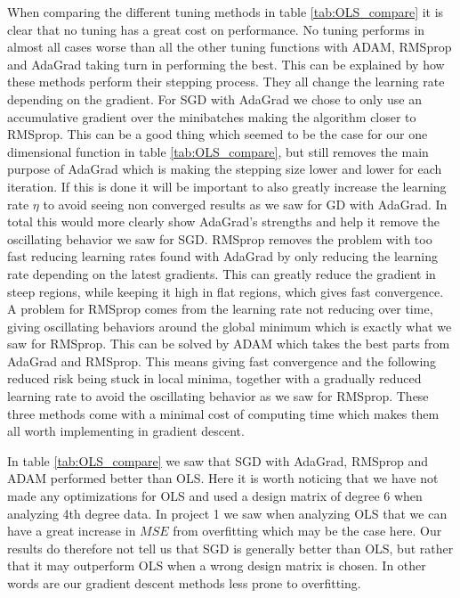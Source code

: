 \documentclass[11pt]{article}
\begin{document}
When comparing the different tuning methods in table \ref{tab:OLS_compare} it is clear that no tuning has a great cost on performance. No tuning performs in almost all cases worse than all the other tuning functions with ADAM, RMSprop and AdaGrad taking turn in performing the best. This can be explained by how these methods perform their stepping process. They all change the learning rate depending on the gradient. For SGD with AdaGrad we chose to only use an accumulative gradient over the minibatches making the algorithm closer to RMSprop. This can be a good thing which seemed to be the case for our one dimensional function in table \ref{tab:OLS_compare}, but still removes the main purpose of AdaGrad which is making the stepping size lower and lower for each iteration. If this is done it will be important to also greatly increase the learning rate $\eta$ to avoid seeing non converged results as we saw for GD with AdaGrad. In total this would more clearly show AdaGrad's strengths and help it remove the oscillating behavior we saw for SGD. RMSprop removes the problem with too fast reducing learning rates found with AdaGrad by only reducing the learning rate depending on the latest gradients. This can greatly reduce the gradient in steep regions, while keeping it high in flat regions, which gives fast convergence. A problem for RMSprop comes from the learning rate not reducing over time, giving oscillating behaviors around the global minimum which is exactly what we saw for RMSprop. This can be solved by ADAM which takes the best parts from AdaGrad and RMSprop. This means giving fast convergence and the following reduced risk being stuck in local minima, together with a gradually reduced learning rate to avoid the oscillating behavior as we saw for RMSprop. These three methods come with a minimal cost of computing time which makes them all worth implementing in gradient descent.

In table \ref{tab:OLS_compare} we saw that SGD with AdaGrad, RMSprop and ADAM performed better than OLS. Here it is worth noticing that we have not made any optimizations for OLS and used a design matrix of degree 6 when analyzing 4th degree data. In project 1 \cite{project1} we saw when analyzing OLS that we can have a great increase in $MSE$ from overfitting which may be the case here. Our results do therefore not tell us that SGD is generally better than OLS, but rather that it may outperform OLS when a wrong design matrix is chosen. In other words are our gradient descent methods less prone to overfitting.
\end{document}
